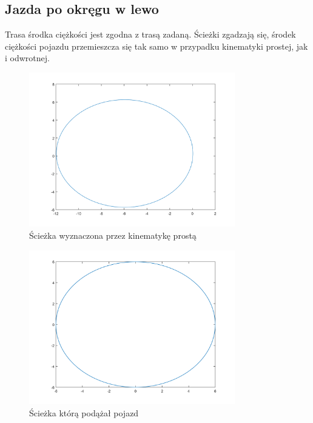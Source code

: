 \documentclass[a4paper, 12pt]{report}
\begin{document}
			\subsection{Jazda po okręgu w lewo}
				Trasa środka ciężkości jest zgodna z trasą zadaną. Ścieżki zgadzają się, środek ciężkości pojazdu przemieszcza się tak samo w przypadku kinematyki prostej, jak i odwrotnej.
				\begin{figure}[H]
					\centering
					\includegraphics[width = 0.8\textwidth]{./AP/img/rev/left_circle_in_1.png}
					\caption{Ścieżka wyznaczona przez kinematykę prostą}
				\end{figure}
				\begin{figure}[H]
					\centering
					\includegraphics[width = 0.8\textwidth]{./AP/img/rev/left_circle_in_2.png}
					\caption{Ścieżka którą podążał pojazd}
				\end{figure}
\end{document}

